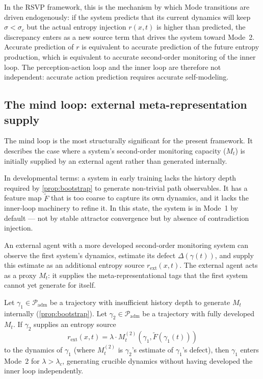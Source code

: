 \documentclass[12pt, oneside]{memoir}
\newcommand{\Ft}{\widetilde{F}}
\newcommand{\Padm}{\mathcal{P}_{\mathrm{adm}}}
\begin{document}
In the RSVP framework, this is the mechanism by which Mode transitions are driven
endogenously: if the system predicts that its current dynamics will keep $\sigma <
\sigma_c$ but the actual entropy injection $r(x,t)$ is higher than predicted, the
discrepancy enters as a new source term that drives the system toward Mode~2.  Accurate
prediction of $r$ is equivalent to accurate prediction of the future entropy production,
which is equivalent to accurate second-order monitoring of the inner loop.  The
perception-action loop and the inner loop are therefore not independent: accurate action
prediction requires accurate self-modeling.

\subsection{The mind loop: external meta-representation supply}

The mind loop is the most structurally significant for the present framework.  It
describes the case where a system's second-order monitoring capacity ($M_t$) is
initially supplied by an external agent rather than generated internally.

In developmental terms: a system in early training lacks the history depth required by
\cref{prop:bootstrap} to generate non-trivial path observables.  It has a feature map
$\Ft$ that is too coarse to capture its own dynamics, and it lacks the inner-loop
machinery to refine it.  In this state, the system is in Mode~1 by default — not by
stable attractor convergence but by absence of contradiction injection.

An external agent with a more developed second-order monitoring system can observe the
first system's dynamics, estimate its defect $\Delta(\gamma(t))$, and supply this
estimate as an additional entropy source $r_{\mathrm{ext}}(x,t)$.  The external agent
acts as a proxy $M_t$: it supplies the meta-representational tags that the first system
cannot yet generate for itself.

\begin{proposition}
\label{prop:ext-meta}
Let $\gamma_1 \in \Padm$ be a trajectory with insufficient history depth to generate
$M_t$ internally (\cref{prop:bootstrap}).  Let $\gamma_2 \in \Padm$ be a trajectory
with fully developed $M_t$.  If $\gamma_2$ supplies an entropy source
\[
  r_{\mathrm{ext}}(x,t) = \lambda \cdot M_t^{(2)}(\gamma_1, \Ft(\gamma_1(t)))
\]
to the dynamics of $\gamma_1$ (where $M_t^{(2)}$ is $\gamma_2$'s estimate of
$\gamma_1$'s defect), then $\gamma_1$ enters Mode~2 for $\lambda > \lambda_c$,
generating crucible dynamics without having developed the inner loop independently.
\end{proposition}
\end{document}
